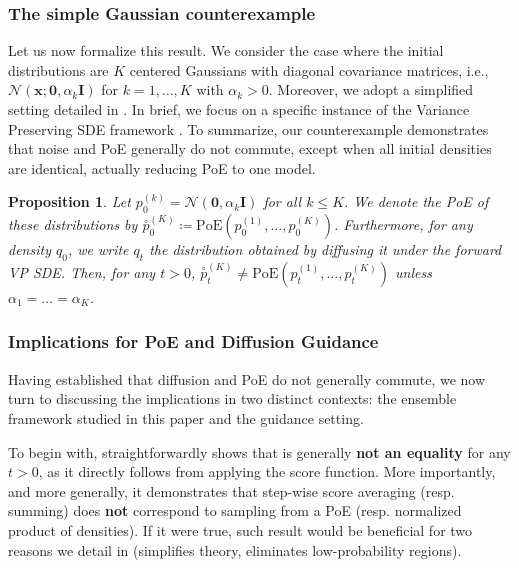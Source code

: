 \documentclass[10pt]{article} %
\newtheorem{proposition}{Proposition}[section]
\def\rvx{{\mathbf{x}}}
\def\vzero{{\bm{0}}}
\def\mI{{\bm{I}}}
\newcommand{\geo}[1]{\overset{\circ}{#1}}
\begin{document}
\subsubsection{The simple Gaussian counterexample}\label{section: proposition gaussian}

Let us now formalize this result. We consider the case where the initial distributions are $K$ centered Gaussians with diagonal covariance matrices, i.e., $\mathcal{N}(\rvx; \vzero, \alpha_k \mI)$ for $k = 1, \dots, K$ with $\alpha_k > 0$. Moreover, we adopt a simplified setting detailed in . In brief, we focus on a specific instance of the Variance Preserving SDE framework \citep{song2021scorebasedgenerativemodelingstochastic}. To summarize, our counterexample demonstrates that noise and PoE generally do not commute, except when all initial densities are identical, actually reducing PoE to one model.

\begin{proposition}\label{proposition: counter example gaussian case true}
Let $p_0^{(k)} = \mathcal{N}(\vzero, \alpha_k \mI)$ for all $k \leq K$. We denote the PoE of these  distributions by
$\geo{p}^{(K)}_0 \coloneqq \mathrm{PoE}(p_0^{(1)}, \dots, p_0^{(K)})$. Furthermore, for any density $q_0$, we write $q_t$ the distribution obtained by diffusing it under the forward VP SDE. Then, for any $t>0$, $\geo{p}^{(K)}_t \neq \text{PoE}(p^{(1)}_t, \dots,p^{(K)}_t)$ unless $ \alpha_1 = \dots = \alpha_K$.

\end{proposition}
\subsubsection{Implications for PoE and Diffusion Guidance}\label{section: what does it say}

Having established that diffusion and PoE do not generally commute, we now turn to discussing the implications in two distinct contexts: the ensemble framework studied in this paper and the guidance setting.

To begin with,  straightforwardly shows that  is generally \textbf{not an equality} for any $t > 0$, as it directly follows from applying the score function. More importantly, and more generally, it demonstrates that step-wise score averaging (resp. summing) does \textbf{not} correspond to sampling from a PoE (resp. normalized product of densities). If it were true, such result would be beneficial for two reasons we detail in  (simplifies theory, eliminates low-probability regions).
\end{document}
